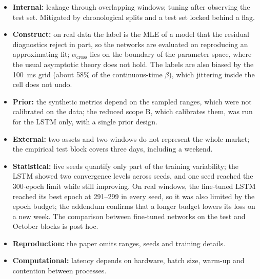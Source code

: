\begin{itemize}
  \item \textbf{Internal:} leakage through overlapping windows; tuning after observing
        the test set. Mitigated by chronological splits and a test set locked behind a
        flag.
  \item \textbf{Construct:} on real data the label is the MLE of a model that the
        residual diagnostics reject in part, so the networks are evaluated on reproducing
        an approximating fit; $\alpha_{\mathrm{cross}}$ lies on the boundary of the
        parameter space, where the usual asymptotic theory does not hold. The labels are
        also biased by the 100~ms grid (about 58\% of the continuous-time $\beta$), which
        jittering inside the cell does not undo.
  \item \textbf{Prior:} the synthetic metrics depend on the sampled ranges, which were
        not calibrated on the data; the reduced scope B, which calibrates them, was run for
        the LSTM only, with a single prior design.
  \item \textbf{External:} two assets and two windows do not represent the whole
        market; the empirical test block covers three days, including a weekend.
  \item \textbf{Statistical:} five seeds quantify only part of the training
        variability; the LSTM showed two convergence levels across seeds, and one
        seed reached the 300-epoch limit while still improving. On real windows, the
        fine-tuned LSTM reached its best epoch at 291--299 in every seed, so it was also
        limited by the epoch budget; the addendum confirms that a longer budget lowers its
        loss on a new week. The comparison between fine-tuned networks on the test
        and October blocks is post hoc.
  \item \textbf{Reproduction:} the paper omits ranges, seeds and training details.
  \item \textbf{Computational:} latency depends on hardware, batch size, warm-up and
        contention between processes.
\end{itemize}
